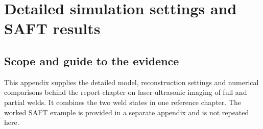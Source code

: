 \newcommand{\saftappFullContrast}{12.79}
\newcommand{\saftappFullPercentile}{21.28}
\newcommand{\saftappFullCoverage}{100.0}
\newcommand{\saftappFullPeak}{5.18}
\newcommand{\saftappFullDistance}{0.033}
\newcommand{\saftappPartialContrast}{4.36}
\newcommand{\saftappPartialPercentile}{8.74}
\newcommand{\saftappPartialCoverage}{95.8}
\newcommand{\saftappPartialPeak}{16.57}
\newcommand{\saftappPartialDistance}{0.046}
\newcommand{\saftappPartialPeakExact}{16.568}
\newcommand{\saftappPartialX}{2.80}
\newcommand{\saftappPartialZ}{19.95}
\newcommand{\saftappPartialDistanceExact}{0.0458}
\newcommand{\saftappPartialContrastExact}{4.36}
\newcommand{\saftappPartialPristinePeakExact}{6.820}
\newcommand{\saftappPartialPristineX}{-6.90}
\newcommand{\saftappPartialPristineZ}{23.25}
\newcommand{\saftappPartialPristineDistanceExact}{9.8685}
\newcommand{\saftappPartialPristineContrastExact}{-6.87}
\newcommand{\saftappPartialDifferencePeakExact}{32.743}
\newcommand{\saftappPartialDifferenceX}{2.80}
\newcommand{\saftappPartialDifferenceZ}{18.05}
\newcommand{\saftappPartialDifferenceDistanceExact}{0.4187}
\newcommand{\saftappPartialDifferenceContrastExact}{11.09}
\newcommand{\saftappPartialFinerContrast}{4.36}
\newcommand{\saftappPartialFinerCoverage}{95.8}
\newcommand{\saftappPartialWideContrast}{6.43}
\newcommand{\saftappPartialWideCoverage}{94.3}
\newcommand{\saftappPartialFloorSourceContrast}{8.77}
\newcommand{\saftappPartialFloorSourceCoverage}{48.5}
\newcommand{\saftappPartialPlateContrast}{4.33}
\newcommand{\saftappPartialPlateCoverage}{95.8}
\newcommand{\saftappPartialFloorReceiverContrast}{-4.82}
\newcommand{\saftappPartialFloorReceiverCoverage}{95.8}
\newcommand{\saftappPartialBandOneFiveContrast}{4.20}
\newcommand{\saftappPartialBandOneFiveCoverage}{95.8}
\newcommand{\saftappPartialShortBandContrast}{4.29}
\newcommand{\saftappPartialShortBandCoverage}{95.8}
\newcommand{\saftappPartialShortLowContrast}{4.34}
\newcommand{\saftappPartialShortLowCoverage}{95.8}
\newcommand{\saftappPartialDisplayReference}{40}


\chapter{Detailed simulation settings and SAFT results}
\label{app:saft_details}
\label{explain:app_full}
\label{explain:app_partial}

\section{Scope and guide to the evidence}
\label{saftapp:scope}
This appendix supplies the detailed model, reconstruction settings and numerical comparisons behind the report chapter on laser-ultrasonic imaging of full and partial welds. It combines the two weld states in one reference chapter. The worked SAFT example is provided in a separate appendix and is not repeated here.

